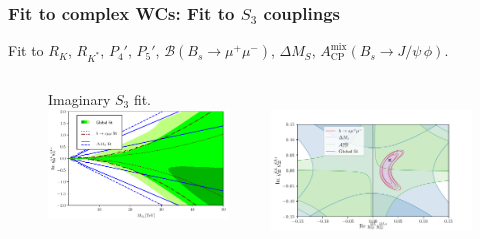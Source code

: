 \documentclass[mathserif, 10pt, dvipsnames]{beamer}
\begin{document}
\begin{frame}\frametitle{Fit to complex WCs: Fit to $S_3$ couplings}
Fit to $R_K$, $R_{K^*}$, $P_4'$, $P_5'$, $\mathcal{B}(B_s \to \mu^+ \mu^-)$, $\Delta M_S$, $A_\mathrm{CP}^\mathrm{mix}(B_s \to J/\psi\, \phi)$.\\[0.3em]

    \begin{figure}
        \begin{columns}
            \begin{column}{0.48\textwidth}
                \centering
{\small Imaginary $S_3$ fit.}\\
\includegraphics[width=0.9\textwidth]{figures/fitim_LQ.pdf}
            \end{column}
            \begin{column}{0.48\textwidth}
\hspace*{1.5cm}{\small Complex $S_3$ fit.}\\
\includegraphics[width=1.0\textwidth]{figures/fitcompl_LQ.pdf}

            \end{column}
        \end{columns}
    \end{figure}


\end{frame}
\end{document}
